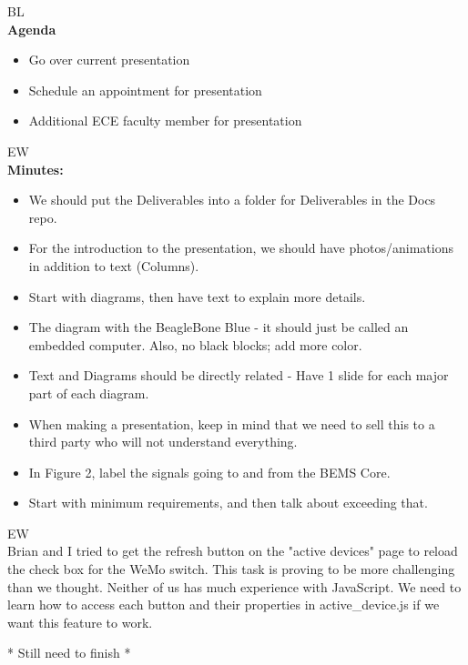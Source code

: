 \documentclass[fontsize=11pt, %
                             paper=letter, %
                             openany, %
                             captions=tableheading,
                             index=totoc,
                             hyperref]{labbook}
\begin{document}
BL\\
\textbf{Agenda}
\begin{itemize}
\item Go over current presentation
\item Schedule an appointment for presentation
\item Additional ECE faculty member for presentation
\end{itemize}

EW\\
\textbf{Minutes:}
\begin{itemize}
\item We should put the Deliverables into a folder for Deliverables in the Docs repo.
\item For the introduction to the presentation, we should have photos/animations in addition to text (Columns).
\item Start with diagrams, then have text to explain more details.
\item The diagram with the BeagleBone Blue - it should just be called an embedded computer. Also, no black blocks; add more color.
\item Text and Diagrams should be directly related - Have 1 slide for each major part of each diagram.
\item When making a presentation, keep in mind that we need to sell this to a third party who will not understand everything.
\item In Figure 2, label the signals going to and from the BEMS Core.
\item Start with minimum requirements, and then talk about exceeding that.
\end{itemize}

EW\\
Brian and I tried to get the refresh button on the "active devices" page to reload the check box for the WeMo switch. This task is proving to be more challenging than we thought. Neither of us has much experience with JavaScript. We need to learn how to access each button and their properties in active\_device.js if we want this feature to work.

* Still need to finish *
\end{document}

